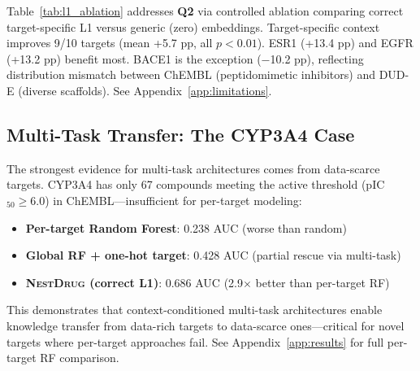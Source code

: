 \documentclass{article}
\newcommand{\methodname}{\textsc{NestDrug}}
\begin{document}
Table~\ref{tab:l1_ablation} addresses \textbf{Q2} via controlled ablation comparing correct target-specific L1 versus generic (zero) embeddings. Target-specific context improves 9/10 targets (mean +5.7 pp, all $p < 0.01$). ESR1 (+13.4 pp) and EGFR (+13.2 pp) benefit most. BACE1 is the exception ($-$10.2 pp), reflecting distribution mismatch between ChEMBL (peptidomimetic inhibitors) and DUD-E (diverse scaffolds). See Appendix~\ref{app:limitations}.

\subsection{Multi-Task Transfer: The CYP3A4 Case}

The strongest evidence for multi-task architectures comes from data-scarce targets. CYP3A4 has only 67 compounds meeting the active threshold (pIC$_{50} \geq 6.0$) in ChEMBL---insufficient for per-target modeling:
\begin{itemize}[noitemsep,topsep=0pt]
    \item \textbf{Per-target Random Forest}: 0.238 AUC (worse than random)
    \item \textbf{Global RF + one-hot target}: 0.428 AUC (partial rescue via multi-task)
    \item \textbf{\methodname{} (correct L1)}: 0.686 AUC (2.9$\times$ better than per-target RF)
\end{itemize}
This demonstrates that context-conditioned multi-task architectures enable knowledge transfer from data-rich targets to data-scarce ones---critical for novel targets where per-target approaches fail. See Appendix~\ref{app:results} for full per-target RF comparison.
\end{document}
